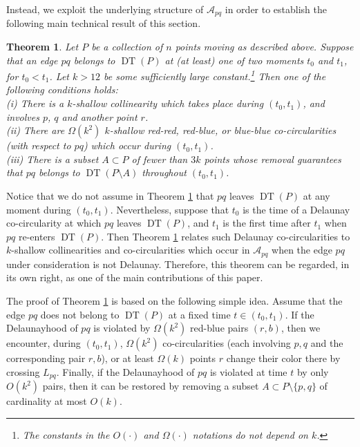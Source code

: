 \documentclass[letter,11pt]{article}
\newtheorem{theorem}{Theorem}[section]
\def\A{\mathcal{A}}
\def \L{{L}}
\def\DT{\mathop{\mathrm{DT}}}
\begin{document}
Instead, we exploit the underlying structure of $\A_{pq}$ in order to establish the following
main technical result of this section.

\begin{theorem}\label{Thm:RedBlue}
Let $P$ be a collection of $n$ points moving as described above. Suppose that an edge $pq$ belongs to $\DT(P)$ at (at least) one of two moments $t_0$ and $t_1$, for $t_0<t_1$.
Let $k>12$ be some sufficiently large constant.\footnote{The constants in the $O(\cdot)$ and $\Omega(\cdot)$ notations do not depend on $k$.}
Then one of the following conditions holds:\\
\indent (i) There is a $k$-shallow collinearity which takes place during $(t_0,t_1)$, and involves $p$, $q$ and another point $r$.\\
\indent (ii) There are $\Omega(k^2)$ $k$-shallow red-red, red-blue, or blue-blue co-circularities (with respect to $pq$) which occur during $(t_0,t_1)$.\\
\indent (iii) There is a subset $A\subset P$ of fewer than $3k$ points whose removal guarantees that $pq$ belongs to $\DT(P\setminus A)$ throughout $(t_0,t_1)$.
\end{theorem}

Notice that we do not assume in Theorem \ref{Thm:RedBlue} that $pq$ leaves $\DT(P)$ at any moment during $(t_0,t_1)$. 
Nevertheless, suppose that $t_0$ is the time of a Delaunay co-circularity at which $pq$ leaves $\DT(P)$, and $t_1$ is the first time after $t_1$ when $pq$ re-enters $\DT(P)$.
Then Theorem \ref{Thm:RedBlue} relates such Delaunay co-circularities to $k$-shallow collinearities and co-circularities which occur in $\A_{pq}$ when the edge $pq$ under consideration is not Delaunay.
Therefore, this theorem can be regarded, in its own right, as one of the main contributions of this paper.






The proof of Theorem \ref{Thm:RedBlue} is based on the following simple idea. Assume that the edge $pq$ does not belong to $\DT(P)$ at a fixed time $t\in (t_0,t_1)$. If the Delaunayhood of $pq$ is violated by $\Omega(k^2)$ red-blue pairs $(r,b)$, then we encounter, during $(t_0,t_1)$, $\Omega(k^2)$ co-circularities (each involving $p,q$ and the corresponding pair $r,b$), or at least $\Omega(k)$ points $r$ change their color there by crossing $\L_{pq}$. 
Finally, if the Delaunayhood of $pq$ is violated at time $t$ by only $O(k^2)$ pairs, then it can be restored by removing a subset $A\subset P\setminus\{p,q\}$ of cardinality at most $O(k)$. 
\end{document}
